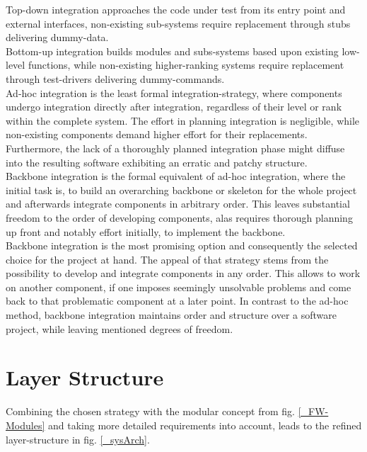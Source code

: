 \documentclass[master,english,smartquotes,apa]{hgbthesis}
\begin{document}
			Top-down integration approaches the code under test from its entry point and external interfaces, non-existing sub-systems require replacement through stubs delivering dummy-data. \\
			
			Bottom-up integration builds modules and subs-systems based upon existing low-level functions, while non-existing higher-ranking systems require replacement through test-drivers delivering dummy-commands. \\
			
			Ad-hoc integration is the least formal integration-strategy, where components undergo integration directly after integration, regardless of their level or rank within the complete system. The effort in planning integration is negligible, while non-existing components demand higher effort for their replacements. Furthermore, the lack of a thoroughly planned integration phase might diffuse into the resulting software exhibiting an erratic and patchy structure. \\
			
			Backbone integration \cite{Beizer90} is the formal equivalent of ad-hoc integration, where the initial task is, to build an overarching backbone or skeleton for the whole project and afterwards integrate components in arbitrary order. This leaves substantial freedom to the order of developing components, alas requires thorough planning up front and notably effort initially, to implement the backbone. \\

			Backbone integration is the most promising option and consequently the selected choice for the project at hand. The appeal of that strategy stems from the possibility to develop and integrate components in any order. This allows to work on another component, if one imposes seemingly unsolvable problems and come back to that problematic component at a later point. In contrast to the ad-hoc method, backbone integration maintains order and structure over a software project, while leaving mentioned degrees of freedom. \\

		\section{Layer Structure}
		Combining the chosen strategy with the modular concept from fig. \ref{_FW-Modules} and taking more detailed requirements into account, leads to the refined layer-structure in fig. \ref{_sysArch}.
\end{document}
